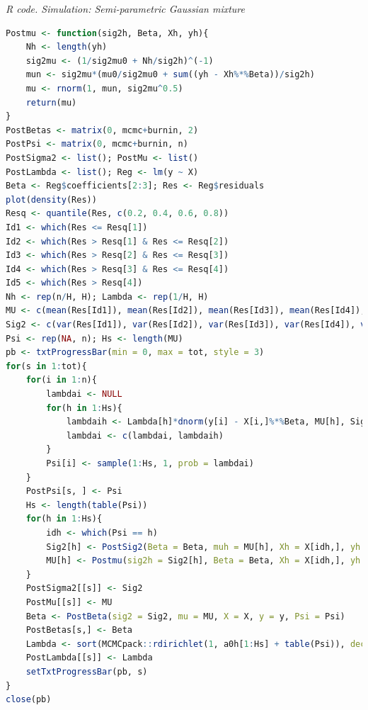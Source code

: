 \begin{enumerate}[leftmargin=*]
\begin{tcolorbox}[enhanced,width=4.67in,center upper,
	fontupper=\large\bfseries,drop shadow southwest,sharp corners]
	\textit{R code. Simulation: Semi-parametric Gaussian mixture}
	\begin{VF}
		\begin{lstlisting}[language=R]
Postmu <- function(sig2h, Beta, Xh, yh){
	Nh <- length(yh)
	sig2mu <- (1/sig2mu0 + Nh/sig2h)^(-1)
	mun <- sig2mu*(mu0/sig2mu0 + sum((yh - Xh%*%Beta))/sig2h)
	mu <- rnorm(1, mun, sig2mu^0.5)
	return(mu)
}
PostBetas <- matrix(0, mcmc+burnin, 2)
PostPsi <- matrix(0, mcmc+burnin, n)
PostSigma2 <- list(); PostMu <- list()
PostLambda <- list(); Reg <- lm(y ~ X)
Beta <- Reg$coefficients[2:3]; Res <- Reg$residuals
plot(density(Res))
Resq <- quantile(Res, c(0.2, 0.4, 0.6, 0.8))
Id1 <- which(Res <= Resq[1])
Id2 <- which(Res > Resq[1] & Res <= Resq[2])
Id3 <- which(Res > Resq[2] & Res <= Resq[3])
Id4 <- which(Res > Resq[3] & Res <= Resq[4])
Id5 <- which(Res > Resq[4])
Nh <- rep(n/H, H); Lambda <- rep(1/H, H)
MU <- c(mean(Res[Id1]), mean(Res[Id2]), mean(Res[Id3]), mean(Res[Id4]), mean(Res[Id5]))
Sig2 <- c(var(Res[Id1]), var(Res[Id2]), var(Res[Id3]), var(Res[Id4]), var(Res[Id5]))
Psi <- rep(NA, n); Hs <- length(MU)
pb <- txtProgressBar(min = 0, max = tot, style = 3)
for(s in 1:tot){
	for(i in 1:n){
		lambdai <- NULL
		for(h in 1:Hs){
			lambdaih <- Lambda[h]*dnorm(y[i] - X[i,]%*%Beta, MU[h], Sig2[h]^0.5)
			lambdai <- c(lambdai, lambdaih)
		}
		Psi[i] <- sample(1:Hs, 1, prob = lambdai)
	}
	PostPsi[s, ] <- Psi
	Hs <- length(table(Psi))
	for(h in 1:Hs){
		idh <- which(Psi == h)
		Sig2[h] <- PostSig2(Beta = Beta, muh = MU[h], Xh = X[idh,], yh = y[idh])
		MU[h] <- Postmu(sig2h = Sig2[h], Beta = Beta, Xh = X[idh,], yh = y[idh])
	}
	PostSigma2[[s]] <- Sig2
	PostMu[[s]] <- MU 
	Beta <- PostBeta(sig2 = Sig2, mu = MU, X = X, y = y, Psi = Psi)
	PostBetas[s,] <- Beta
	Lambda <- sort(MCMCpack::rdirichlet(1, a0h[1:Hs] + table(Psi)), decreasing = TRUE)
	PostLambda[[s]] <- Lambda
	setTxtProgressBar(pb, s)
}
close(pb)
\end{lstlisting}
	\end{VF}
\end{tcolorbox}


\end{enumerate}
